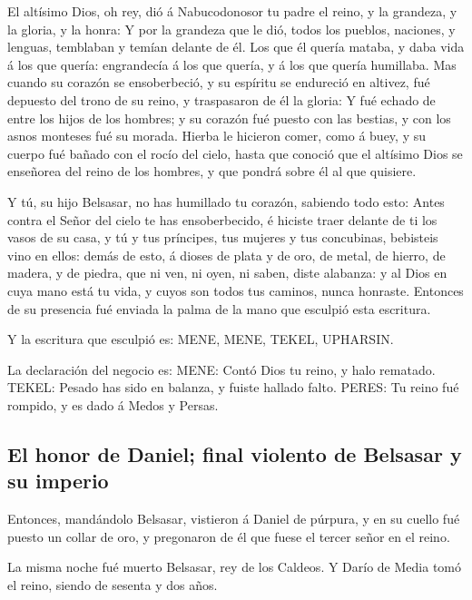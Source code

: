  El altísimo Dios, oh rey, dió á Nabucodonosor tu padre el
reino, y la grandeza, y la gloria, y la honra:  Y por la
grandeza que le dió, todos los pueblos, naciones, y lenguas, temblaban y
temían delante de él. Los que él quería mataba, y daba vida á los que
quería: engrandecía á los que quería, y á los que quería humillaba.
 Mas cuando su corazón se ensoberbeció, y su espíritu se
endureció en altivez, fué depuesto del trono de su reino, y traspasaron
de él la gloria:  Y fué echado de entre los hijos de los
hombres; y su corazón fué puesto con las bestias, y con los asnos
monteses fué su morada. Hierba le hicieron comer, como á buey, y su
cuerpo fué bañado con el rocío del cielo, hasta que conoció que el
altísimo Dios se enseñorea del reino de los hombres, y que pondrá sobre
él al que quisiere.

 Y tú, su hijo Belsasar, no has humillado tu corazón,
sabiendo todo esto:  Antes contra el Señor del cielo te has
ensoberbecido, é hiciste traer delante de ti los vasos de su casa, y tú
y tus príncipes, tus mujeres y tus concubinas, bebisteis vino en ellos:
demás de esto, á dioses de plata y de oro, de metal, de hierro, de
madera, y de piedra, que ni ven, ni oyen, ni saben, diste alabanza: y al
Dios en cuya mano está tu vida, y cuyos son todos tus caminos, nunca
honraste.  Entonces de su presencia fué enviada la palma de
la mano que esculpió esta escritura.

 Y la escritura que esculpió es: MENE, MENE, TEKEL,
UPHARSIN.

 La declaración del negocio es: MENE: Contó Dios tu reino,
y halo rematado.  TEKEL: Pesado has sido en balanza, y
fuiste hallado falto.  PERES: Tu reino fué rompido, y es
dado á Medos y Persas.

\hypertarget{el-honor-de-daniel-final-violento-de-belsasar-y-su-imperio}{%
\subsection{El honor de Daniel; final violento de Belsasar y su
imperio}\label{el-honor-de-daniel-final-violento-de-belsasar-y-su-imperio}}

 Entonces, mandándolo Belsasar, vistieron á Daniel de
púrpura, y en su cuello fué puesto un collar de oro, y pregonaron de él
que fuese el tercer señor en el reino.

 La misma noche fué muerto Belsasar, rey de los Caldeos.
 Y Darío de Media tomó el reino, siendo de sesenta y dos
años.

